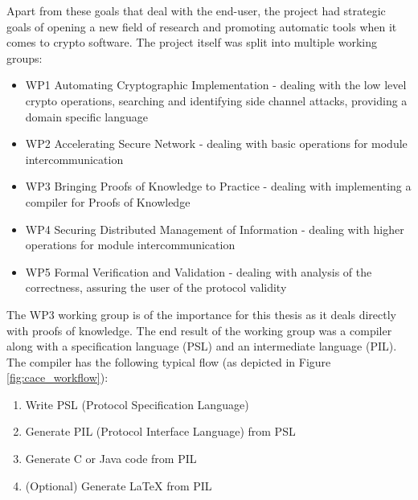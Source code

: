 Apart from these goals that deal with the end-user, the project had
strategic goals of opening a new field of research and promoting
automatic tools when it comes to crypto software. The project itself
was split into multiple working groups:
\begin{itemize}
\item WP1 Automating Cryptographic Implementation - dealing with the
  low level crypto operations, searching and identifying side channel
  attacks, providing a domain specific language
\item WP2 Accelerating Secure Network - dealing with basic operations
  for module intercommunication
\item WP3 Bringing Proofs of Knowledge to Practice - dealing with
  implementing a compiler for Proofs of Knowledge
\item WP4 Securing Distributed Management of Information - dealing
  with higher operations for module intercommunication
\item WP5 Formal Verification and Validation - dealing with analysis
  of the correctness, assuring the user of the protocol validity
\end{itemize}

The WP3 working group is of the importance for this thesis as it deals
directly with proofs of knowledge. The end result of the working group
was a compiler along with a specification language (PSL) and an
intermediate language (PIL). The compiler has the following typical
flow (as depicted in Figure \ref{fig:cace_workflow}):
\begin{enumerate}
\item Write PSL (Protocol Specification Language)
\item Generate PIL (Protocol Interface Language) from PSL
\item Generate C or Java code from PIL
\item (Optional) Generate LaTeX from PIL
\end{enumerate}

